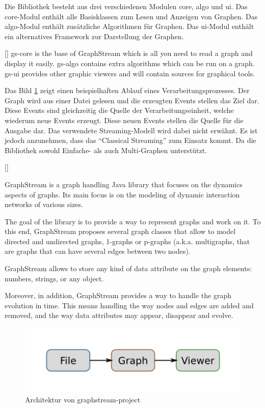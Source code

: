Die Bibliothek besteht aus drei verschiedenen Modulen core, algo und ui. Das
core-Modul enthält alle Basisklassen zum Lesen und Anzeigen von Graphen. Das
algo-Modul enthält zusätzliche Algorithmen für Graphen. Das ui-Modul enthält ein
alternatives Framework zur Darstellung der Graphen.

[\cite{Team2018}]{
gs-core is the base of GraphStream which is all you need to read a graph and
display it easily. gs-algo contains extra algorithms which can be run on a graph.
gs-ui provides other graphic viewers and will contain sources for graphical tools.
}

Das Bild \ref{fig:graphstream-project-architecture} zeigt einen beispielhaften
Ablauf eines Verarbeitungsprozesses. Der Graph wird aus einer Datei gelesen und
die erzeugten Events stellen das Ziel dar. Diese Events sind gleichzeitig die
Quelle der Verarbeitungseinheit, welche wiederum neue Events erzeugt. Diese neuen
Events stellen die Quelle für die Ausgabe dar. Das verwendete Streaming-Modell
wird dabei nicht erwähnt. Es ist jedoch anzunehmen, dass das \enquote{Classical Streaming}
zum Einsatz kommt. Da die Bibliothek sowohl Einfache- als auch Multi-Graphen
unterstützt.

[\cite{Team2018}]{
GraphStream is a graph handling Java library that focuses on the dynamics aspects
of graphs. Its main focus is on the modeling of dynamic interaction networks of
various sizes.

The goal of the library is to provide a way to represent graphs and work on it.
To this end, GraphStream proposes several graph classes that allow to model
directed and undirected graphs, 1-graphs or p-graphs (a.k.a. multigraphs, that
are graphs that can have several edges between two nodes).

GraphStream allows to store any kind of data attribute on the graph elements:
numbers, strings, or any object.

Moreover, in addition, GraphStream provides a way to handle the graph evolution
in time. This means handling the way nodes and edges are added and removed, and
the way data attributes may appear, disappear and evolve.
}

\begin{figure}
    \centering
    \includegraphics[width=15cm]{../material/images/graphpipeline-graphstream.png}
    \caption{Architektur von graphstream-project \parencite{Team2018}}
    \label{fig:graphstream-project-architecture}
\end{figure}

